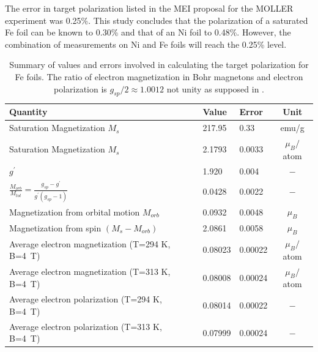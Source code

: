 \documentclass[12pt]{article}
\begin{document}
The error in target polarization listed in the MEI proposal for the MOLLER experiment was 0.25\%. This study concludes that the polarization of a saturated Fe foil can be known to 0.30\% and that of an Ni foil to 0.48\%.  However, the combination of measurements on Ni and Fe foils will reach the 0.25\% level.
\begin{table}[h]
\begin{center}
\begin{tabular}{|l|l|l|c|}\hline
Quantity&Value&Error&Unit\\\hline
Saturation Magnetization $M_s$&217.95&0.33&emu/g\\
Saturation Magnetization $M_s$&2.1793&0.0033&$\mu_B/$atom\\
$g^{\prime}$&1.920&0.004&$-$\\
$\frac{M_{orb}}{M_{tot}}=\frac{g_{sp}-g^{\prime}}{g^{\prime}(g_{sp}-1)}$&0.0428&0.0022&$-$\\
Magnetization from orbital motion $M_{orb}$&0.0932&0.0048&$\mu_B$\\
Magnetization from spin $(M_s-M_{orb})$&2.0861&0.0058&$\mu_B$\\
Average electron magnetization (T=294 K, B=4~T)&0.08023&0.00022&$\mu_B/$atom\\
Average electron magnetization (T=313 K, B=4~T)&0.08008&0.00024&$\mu_B/$atom\\
Average electron polarization (T=294 K, B=4~T)&0.08014&0.00022&$-$\\
Average electron polarization (T=313 K, B=4~T)&0.07999&0.00024&$-$\\\hline
\end{tabular}
\end{center}
\caption{\label{tab:final_errors_Fe}Summary of values and errors involved in calculating the target polarization for Fe foils. The ratio of electron magnetization in Bohr magnetons and electron polarization is $g_{sp}/2\approx1.0012$ not unity as supposed in \cite{deBever1997}.}
\end{table}
\end{document}
